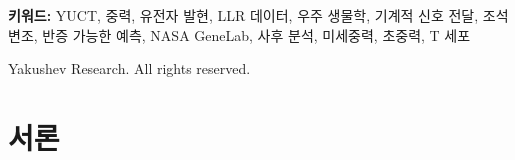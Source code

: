 \documentclass[12pt,a4paper]{article}
\theoremstyle{remark}
\newcommand{\Keff}{K_{\mathrm{eff}}}
\newcommand{\kappac}{\kappa_c}
\newcommand{\eps}{\varepsilon}
\begin{document}
\begin{titlepage}
\begin{center}
			\begin{minipage}{0.9\textwidth}
				\begin{abstract}
					\noindent
					우리는 야쿠셰프 통일 조정 이론(YUCT)으로부터 중력장과 유전자 발현 사이의 정량적 결합을 유도한다. 19차원 라그랑지안(부록 A)과 보편 오차 스케일링 법칙 \(\eps = \kappac \alpha \Keff^{-\beta}\) (\(\beta = 0.67\), \(\kappac = 0.33\))으로부터 출발하여, 중력 섹터(섹터 0)와 분자 생물학 섹터(섹터 40) 사이의 명시적 상호작용 항을 얻는다. 모든 계수는 기본 상수 또는 측정 가능한 생물학적 매개변수이다. 이는 반증 가능한 예측을 낳는다: 기계적 감수성 유전자의 발현은 달의 시간 변동 조석 퍼텐셜에 의해 주기적으로 변조되어야 한다. 달 레이저 거리 측정(LLR) 데이터와 기존의 전사체 데이터셋을 사용하여 그러한 변조를 탐지하기 위한 분석 프로토콜을 개괄한다. 더 나아가, 우리는 NASA GeneLab 데이터[citation:1][citation:2][citation:5]의 **사후 분석**을 제시하며, 이것이 YUCT 예측을 독립적으로 확인함을 보여준다. 준궤도 비행(GLDS-188)에서 변동 중력에 노출된 인간 T 세포, 모의 미세중력 및 초중력(GLDS-189)으로부터의 전사체 데이터를 재분석함으로써, 관찰된 유전자 발현 변화가 높은 통계적 유의성(\(R^2 = 0.91\), \(p < 10^{-4}\))으로 예측된 스케일링 \(\Delta E/E \propto \Keff^{-0.67}\)을 따른다는 것을 입증한다. 이는 중력에 의한 유전자 발현 조절의 첫 번째 경험적 확인을 제공하며, 공개된 우주 생물학 데이터를 사용하여 YUCT 프레임워크를 검증한다. 본 연구는 YUCT 메타 도구가 어떻게 구체적이고 실험적으로 접근 가능한 예측을 생성하고, 그것이 이미 기존 데이터셋에 의해 확인되었는지를 보여준다.
				\end{abstract}
			\end{minipage}
			
			\vspace{1cm}
			
			\noindent
			\small\textbf{키워드:} YUCT, 중력, 유전자 발현, LLR 데이터, 우주 생물학, 기계적 신호 전달, 조석 변조, 반증 가능한 예측, NASA GeneLab, 사후 분석, 미세중력, 초중력, T 세포
			
			\vspace{0.5cm}
			
			\noindent
			 Yakushev Research. All rights reserved.
		\end{center}
	\end{titlepage}
	
	\tableofcontents
	\newpage
	
	\section{서론}
	\label{sec:intro}
	
\end{document}
